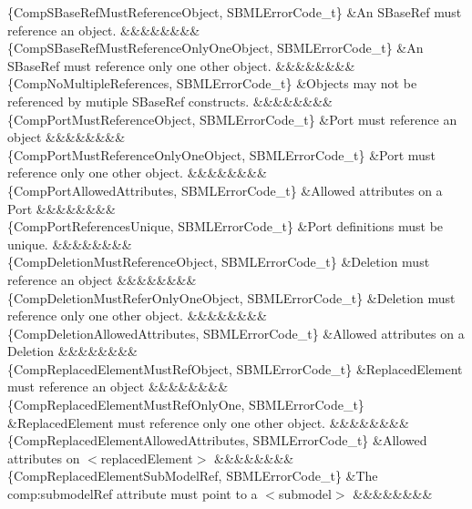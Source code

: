 \begin{DoxyParagraph}{}
\begin{longtabu}
\{Comp\+S\+Base\+Ref\+Must\+Reference\+Object, S\+B\+M\+L\+Error\+Code\+\_\+t\} &An S\+Base\+Ref must reference an object. &&&&&&&&\\
\{Comp\+S\+Base\+Ref\+Must\+Reference\+Only\+One\+Object, S\+B\+M\+L\+Error\+Code\+\_\+t\} &An S\+Base\+Ref must reference only one other object. &&&&&&&&\\
\{Comp\+No\+Multiple\+References, S\+B\+M\+L\+Error\+Code\+\_\+t\} &Objects may not be referenced by mutiple S\+Base\+Ref constructs. &&&&&&&&\\
\{Comp\+Port\+Must\+Reference\+Object, S\+B\+M\+L\+Error\+Code\+\_\+t\} &Port must reference an object &&&&&&&&\\
\{Comp\+Port\+Must\+Reference\+Only\+One\+Object, S\+B\+M\+L\+Error\+Code\+\_\+t\} &Port must reference only one other object. &&&&&&&&\\
\{Comp\+Port\+Allowed\+Attributes, S\+B\+M\+L\+Error\+Code\+\_\+t\} &Allowed attributes on a Port &&&&&&&&\\
\{Comp\+Port\+References\+Unique, S\+B\+M\+L\+Error\+Code\+\_\+t\} &Port definitions must be unique. &&&&&&&&\\
\{Comp\+Deletion\+Must\+Reference\+Object, S\+B\+M\+L\+Error\+Code\+\_\+t\} &Deletion must reference an object &&&&&&&&\\
\{Comp\+Deletion\+Must\+Refer\+Only\+One\+Object, S\+B\+M\+L\+Error\+Code\+\_\+t\} &Deletion must reference only one other object. &&&&&&&&\\
\{Comp\+Deletion\+Allowed\+Attributes, S\+B\+M\+L\+Error\+Code\+\_\+t\} &Allowed attributes on a Deletion &&&&&&&&\\
\{Comp\+Replaced\+Element\+Must\+Ref\+Object, S\+B\+M\+L\+Error\+Code\+\_\+t\} &Replaced\+Element must reference an object &&&&&&&&\\
\{Comp\+Replaced\+Element\+Must\+Ref\+Only\+One, S\+B\+M\+L\+Error\+Code\+\_\+t\} &Replaced\+Element must reference only one other object. &&&&&&&&\\
\{Comp\+Replaced\+Element\+Allowed\+Attributes, S\+B\+M\+L\+Error\+Code\+\_\+t\} &Allowed attributes on {\ttfamily $<$replaced\+Element$>$} &&&&&&&&\\
\{Comp\+Replaced\+Element\+Sub\+Model\+Ref, S\+B\+M\+L\+Error\+Code\+\_\+t\} &The \textquotesingle{}comp\+:submodel\+Ref\textquotesingle{} attribute must point to a {\ttfamily $<$submodel$>$} &&&&&&&&\\

\end{longtabu}
\end{DoxyParagraph}
